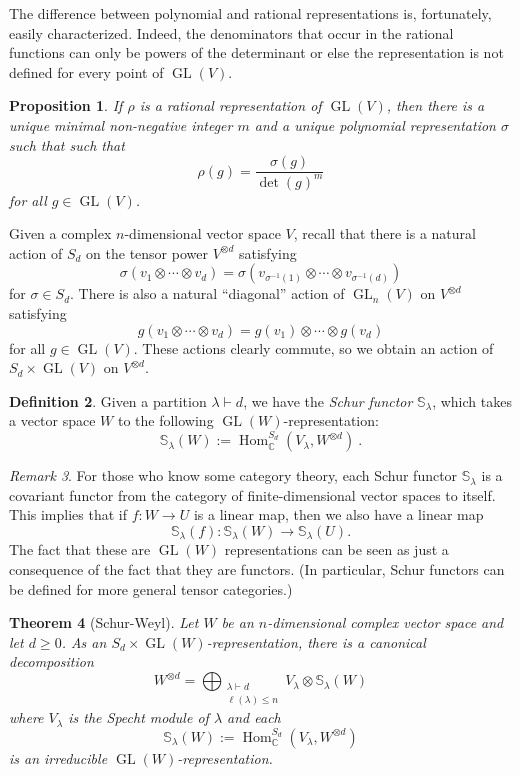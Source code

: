 \documentclass[12pt]{article}
\theoremstyle{plain}
\newtheorem{theorem}{Theorem}[section]
\newtheorem{proposition}[theorem]{Proposition}
\theoremstyle{definition}
\newtheorem{definition}[theorem]{Definition}
\theoremstyle{remark}
\newtheorem{remark}[theorem]{Remark}
\numberwithin{equation}{section}
\begin{document}
The difference between polynomial and rational representations is,
fortunately, easily characterized.  Indeed, the denominators that occur
in the rational functions can only be powers of the determinant or else
the representation is not defined for every point of
$\operatorname{GL}(V)$.

\begin{proposition}
If $\rho$ is a rational representation of $\operatorname{GL}(V)$,
then there is a unique minimal non-negative integer $m$
and a unique polynomial representation $\sigma$
such that
such that
\[
\rho(g) = \frac{\sigma(g)}{\det(g)^m}
\]
for all $g \in \operatorname{GL}(V)$. 
\end{proposition}

Given a complex $n$-dimensional vector space $V$,
recall that there is a natural action of $S_d$ on the tensor power
$V^{\otimes d}$ satisfying
\[
\sigma(v_1 \otimes \cdots \otimes v_d) =
\sigma(v_{\sigma^{-1}(1)} \otimes \cdots \otimes v_{\sigma^{-1}(d)})
\]
for $\sigma \in S_d$.
There is also a natural ``diagonal'' action of $\operatorname{GL}_n(V)$
on $V^{\otimes d}$ satisfying
\[
g(v_1 \otimes \cdots \otimes v_d) = g(v_1) \otimes \cdots \otimes g(v_d)
\]
for all $g \in \operatorname{GL}(V)$.
These actions clearly commute, so we obtain an action of
$S_d \times \operatorname{GL}(V)$ on $V^{\otimes d}$.

\begin{definition}
Given a partition $\lambda \vdash d$, we
have the \emph{Schur functor} $\mathbb{S}_\lambda$,
which takes a vector space $W$ to the following
$\operatorname{GL}(W)$-representation:
\[
\mathbb{S}_\lambda(W) :=
\operatorname{Hom}^{S_d}_{\mathbb{C}}(V_\lambda,W^{\otimes d}) \ .
\]
\end{definition}

\begin{remark}
For those who know some category theory,
each Schur functor $\mathbb{S}_\lambda$ is a covariant functor
from the category of finite-dimensional vector spaces to itself.
This implies that if $f : W \to U$ is a linear map,
then we also have a linear map
\[
\mathbb{S}_\lambda(f) : \mathbb{S}_\lambda(W) \to \mathbb{S}_\lambda(U).
\]
The fact that these are $\operatorname{GL}(W)$ representations can be
seen as just a consequence of the fact that they are functors.
(In particular, Schur functors can be defined for more general
tensor categories.)
\end{remark}

\begin{theorem}[Schur-Weyl]
Let $W$ be an $n$-dimensional complex vector space
and let $d \ge 0$.
As an $S_d \times \operatorname{GL}(W)$-representation, there is a
canonical decomposition
\[
W^{\otimes d} =
\bigoplus_{\substack{\lambda \vdash d\\ \ell(\lambda) \le n}}
V_\lambda \otimes \mathbb{S}_\lambda(W)
\]
where $V_\lambda$ is the Specht module of $\lambda$ and each
\[
\mathbb{S}_\lambda(W) :=
\operatorname{Hom}^{S_d}_{\mathbb{C}}(V_\lambda,W^{\otimes d})
\]
is an irreducible $\operatorname{GL}(W)$-representation.
\end{theorem}
\end{document}
